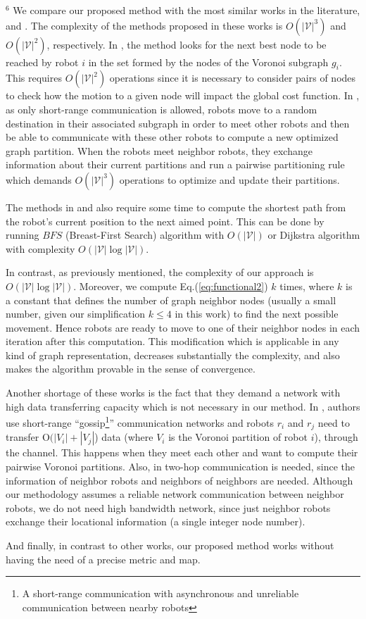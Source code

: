 \documentclass[smallcondensed]{svjour3}
\begin{document}
{\color{blue}$^6$
We compare our proposed method with the most similar works in the literature, \citep{Durham2012} and \citep{Yun2013}. 
The complexity of the methods proposed in these works is $O(|\mathcal{V}|^3)$ and $O(|\mathcal{V}|^2)$, respectively.
%
In \cite{Yun2013}, the method looks for the next best node to be reached by robot $i$ in the set formed by the nodes of the Voronoi subgraph $g_i$. This requires $O(|\mathcal{V}|^2)$ operations since it is necessary to consider pairs of nodes to check how the motion to a given node will impact the global cost function. 
%
In \citep{Durham2012}, as only short-range communication is allowed, robots move to a random destination in their associated subgraph in order to meet other robots and then be able to communicate with these other robots to compute a new optimized graph partition. When the robots meet neighbor robots, they exchange information about their current partitions and run a pairwise partitioning rule which demands $O(|\mathcal{V}|^3)$ operations to optimize and update their partitions.

The methods in \citep{Durham2012} and \citep{Yun2013} also require some time to compute the shortest path from the robot's current position to the next aimed point. This can be done by running $BFS$ (Breast-First Search) algorithm with $O(|\mathcal{V}|)$ or Dijkstra algorithm with complexity $O(|\mathcal{V}| \log |\mathcal{V}|)$. 

 In contrast, as previously mentioned, the complexity of our approach is $O(|\mathcal{V}| \log |\mathcal{V}|)$. Moreover, we compute Eq.(\ref{eq:functional2}) $k$ times, where $k$ is a constant that defines the number of graph neighbor nodes (usually a small number, given our simplification $k \leq 4$ in this work) to find the next possible movement. Hence robots are ready to move to one of their neighbor nodes in each iteration after this computation.
This modification which is applicable in any kind of graph representation, decreases substantially the complexity, and also makes the algorithm provable in the sense of convergence.

Another shortage of these works is the fact that they demand a network with high data transferring capacity which is not necessary in our method. 
%
In \cite{Durham2012}, authors use short-range ``gossip\footnote{A short-range communication with asynchronous and unreliable communication between nearby robots}'' communication networks and robots $r_i$ and $r_j$ need to transfer O$(|V_i | + |V_j |$) data (where $V_i$ is the Voronoi partition of robot $i$), through the channel. This happens when they meet each other and want to compute their pairwise Voronoi partitions. Also, in \cite{Yun2013} two-hop communication is needed, since the information of neighbor robots and neighbors of neighbors are needed.
Although our methodology assumes a reliable network communication between neighbor robots, we do not need high bandwidth network, since just neighbor robots exchange their locational information (a single integer node number).

%
And finally, in contrast to other works, our proposed method works without having the need of a precise metric and map.}
\end{document}
